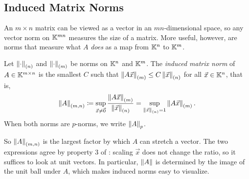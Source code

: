 \subsection{Induced Matrix Norms}

An $m \times n$ matrix can be viewed as a vector in an $mn$-dimensional space, so any vector norm on $\mathbb{K}^{mn}$ measures the size of a matrix. More useful, however, are norms that measure what $A$ \emph{does} as a map from $\mathbb{K}^n$ to $\mathbb{K}^m$.

\begin{definition}
  \label{def:induced}
  Let $\left\lVert \cdot \right\rVert_{(n)}$ and $\left\lVert \cdot \right\rVert_{(m)}$ be norms on $\mathbb{K}^n$ and $\mathbb{K}^m$. The \emph{induced matrix norm} of $A \in \mathbb{K}^{m \times n}$ is the smallest $C$ such that $\left\lVert A\vec{x} \right\rVert_{(m)} \le C\left\lVert \vec{x} \right\rVert_{(n)}$ for all $\vec{x} \in \mathbb{K}^n$, that is,
  \begin{equation}
    \left\lVert A \right\rVert_{(m,n)} \coloneqq \sup_{\vec{x} \ne \vec{0}}\frac{\left\lVert A\vec{x} \right\rVert_{(m)}}{\left\lVert \vec{x} \right\rVert_{(n)}} = \sup_{\left\lVert \vec{x} \right\rVert_{(n)} = 1}\left\lVert A\vec{x} \right\rVert_{(m)}.
  \end{equation}
  When both norms are $p$-norms, we write $\left\lVert A \right\rVert_p$.
\end{definition}

So $\left\lVert A \right\rVert_{(m,n)}$ is the largest factor by which $A$ can stretch a vector. The two expressions agree by property 3 of : scaling $\vec{x}$ does not change the ratio, so it suffices to look at unit vectors. In particular, $\left\lVert A \right\rVert$ is determined by the image of the unit ball under $A$, which makes induced norms easy to visualize.

